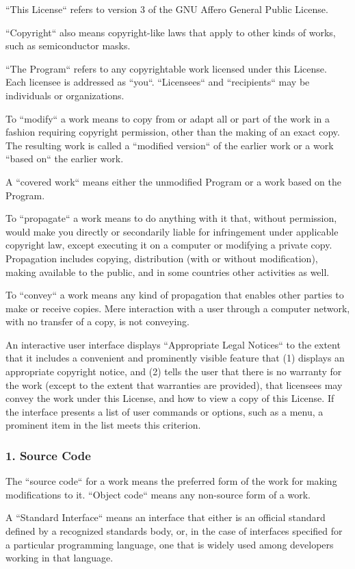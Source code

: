 \documentclass[a4paper, 11pt, twoside]{article}
\begin{document}
“This License“ refers to version 3 of the GNU Affero General Public License.

“Copyright“ also means copyright-like laws that apply to other kinds of works, such as semiconductor masks.

“The Program“ refers to any copyrightable work licensed under this License. Each licensee is addressed as “you“. “Licensees“ and “recipients“ may be individuals or organizations.

To “modify“ a work means to copy from or adapt all or part of the work in a fashion requiring copyright permission, other than the making of an exact copy. The resulting work is called a “modified version“ of the earlier work or a work “based on“ the earlier work.

A “covered work“ means either the unmodified Program or a work based on the Program.

To “propagate“ a work means to do anything with it that, without permission, would make you directly or secondarily liable for infringement under applicable copyright law, except executing it on a computer or modifying a private copy. Propagation includes copying, distribution (with or without modification), making available to the public, and in some countries other activities as well.

To “convey“ a work means any kind of propagation that enables other parties to make or receive copies. Mere interaction with a user through a computer network, with no transfer of a copy, is not conveying.

An interactive user interface displays “Appropriate Legal Notices“ to the extent that it includes a convenient and prominently visible feature that (1) displays an appropriate copyright notice, and (2) tells the user that there is no warranty for the work (except to the extent that warranties are provided), that licensees may convey the work under this License, and how to view a copy of this License. If the interface presents a list of user commands or options, such as a menu, a prominent item in the list meets this criterion.

\subsubsection{1. Source Code}

The “source code“ for a work means the preferred form of the work for making modifications to it. “Object code“ means any non-source form of a work.

A “Standard Interface“ means an interface that either is an official standard defined by a recognized standards body, or, in the case of interfaces specified for a particular programming language, one that is widely used among developers working in that language.
\end{document}

